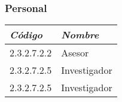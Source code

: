     \subsubsection{Personal}
        \begin{table}[h!]
            \centering
            \begin{tabular}{|p{5cm}|p{5cm}|} \hline
                 
            
            \textit{{\bf{Código}}} &
            \textit{{\bf{Nombre}}}
            \\ \hline

            2.3.2.7.2.2 &
            Asesor
            \\ \hline

            2.3.2.7.2.5 &
            Investigador
            \\ \hline

            2.3.2.7.2.5 &
            Investigador
            \\ \hline

            \end{tabular}
        \end{table}
